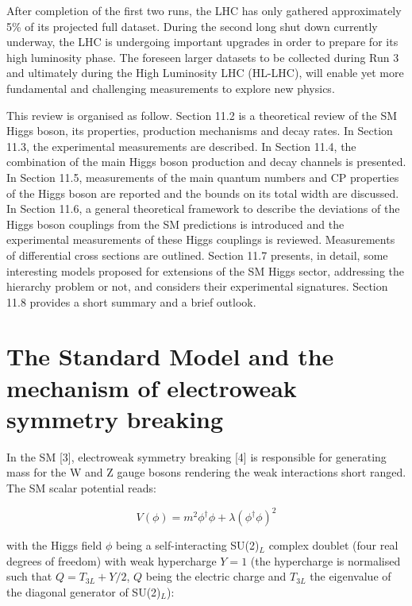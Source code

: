 \documentclass[12pt]{article}
\begin{document}
After completion of the first two runs, the LHC has only gathered approximately 5\% of its projected full dataset. During the second long shut down currently underway, the LHC is undergoing important upgrades in order to prepare for its high luminosity phase. The foreseen larger datasets to be collected during Run 3 and ultimately during the High Luminosity LHC (HL-LHC), will enable yet more fundamental and challenging measurements to explore new physics.

This review is organised as follow. Section 11.2 is a theoretical review of the SM Higgs boson, its properties, production mechanisms and decay rates. In Section 11.3, the experimental measurements are described. In Section 11.4, the combination of the main Higgs boson production and decay channels is presented. In Section 11.5, measurements of the main quantum numbers and CP properties of the Higgs boson are reported and the bounds on its total width are discussed. In Section 11.6, a general theoretical framework to describe the deviations of the Higgs boson couplings from the SM predictions is introduced and the experimental measurements of these Higgs couplings is reviewed. Measurements of differential cross sections are outlined. Section 11.7 presents, in detail, some interesting models proposed for extensions of the SM Higgs sector, addressing the hierarchy problem or not, and considers their experimental signatures. Section 11.8 provides a short summary and a brief outlook.

\section{The Standard Model and the mechanism of electroweak symmetry breaking}

In the SM [3], electroweak symmetry breaking [4] is responsible for generating mass for the W and Z gauge bosons rendering the weak interactions short ranged. The SM scalar potential reads:

\begin{equation}
    V (\phi) = m^2\phi^\dagger\phi + \lambda(\phi^\dagger\phi)^2
\end{equation}

with the Higgs field $\phi$ being a self-interacting SU(2)$_L$ complex doublet (four real degrees of freedom) with weak hypercharge $Y = 1$ (the hypercharge is normalised such that $Q = T_{3L} + Y /2$, $Q$ being the electric charge and $T_{3L}$ the eigenvalue of the diagonal generator of SU(2)$_L$):
\end{document}
